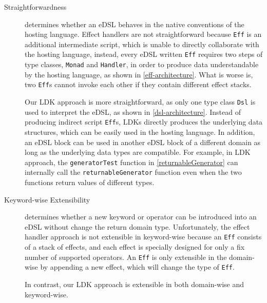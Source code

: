 \begin{description}
  \item[Straightforwardness] determines whether an eDSL behaves in the native conventions of the hosting language. Effect handlers are not straightforward because \lstinline{Eff} is an additional intermediate script, which is unable to directly collaborate with the hosting language, instead, every eDSL written \lstinline{Eff} requires two steps of type classes, \lstinline{Monad} and \lstinline{Handler}, in order to produce data understandable by the hosting language, as shown in \cref{eff-architecture}. What is worse is, two \lstinline{Eff}s cannot invoke each other if they contain different effect stacks.

  Our LDK approach is more straightforward, as only one type class \lstinline{Dsl} is used to interpret the eDSL, as shown in \cref{dsl-architecture}. Instead of producing indirect script \lstinline{Eff}s, LDKs directly produces the underlying data structures, which can be easily used in the hosting language. In addition, an eDSL block can be used in another eDSL block of a different domain as long as the underlying data types are compatible. For example, in LDK approach, the \lstinline{generatorTest} function in \cref{returnableGenerator} can internally call the \lstinline{returnableGenerator} function even when the two functions return values of different types.

  \item[Keyword-wise Extensibility] determines whether a new keyword or operator can be introduced into an eDSL without change the return domain type. Unfortunately, the effect handler approach is not extensible in keyword-wise because an \lstinline{Eff} consists of a stack of effects, and each effect is specially designed for only a fix number of supported operators. An \lstinline{Eff} is only extensible in the domain-wise by appending a new effect, which will change the type of \lstinline{Eff}. 

  In contrast, our LDK approach is extensible in both domain-wise and keyword-wise.

\end{description}

